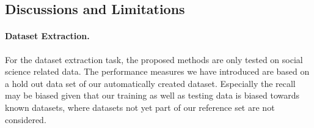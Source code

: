 \subsection{Discussions and Limitations}
\label{sec:discussion}



\paragraph{Dataset Extraction.} 
For the dataset extraction task, the proposed methods are only tested on social science related data.
The performance measures we have introduced are based on a hold out data set of our automatically created dataset.
Especially the recall may be biased given that our training as well as testing data is biased towards known datasets, where datasets not yet part of our reference set are not considered.

